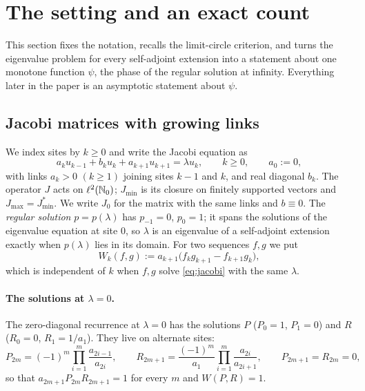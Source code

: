 \section{The setting and an exact count}\label{sec:setting}

This section fixes the notation, recalls the limit-circle criterion, and turns the
eigenvalue problem for every self-adjoint extension into a statement about one
monotone function $\psi$, the phase of the regular solution at infinity. Everything
later in the paper is an asymptotic statement about $\psi$.

\subsection{Jacobi matrices with growing links}

We index sites by $k\ge0$ and write the Jacobi equation as
\begin{equation}\label{eq:jacobi}
  a_k u_{k-1}+b_k u_k+a_{k+1}u_{k+1}=\lambda u_k,\qquad k\ge0,\qquad a_0:=0,
\end{equation}
with links $a_k>0$ $(k\ge1)$ joining sites $k-1$ and $k$, and real diagonal $b_k$. The
operator $J$ acts on $\ell^2(\mathbb{N}_0)$; $J_{\min}$ is its closure on finitely supported
vectors and $J_{\max}=J_{\min}^*$. We write $J_0$ for the matrix with the same links
and $b\equiv0$. The \emph{regular solution} $p=p(\lambda)$ has $p_{-1}=0$, $p_0=1$; it
spans the solutions of the eigenvalue equation at site $0$, so $\lambda$ is an
eigenvalue of a self-adjoint extension exactly when $p(\lambda)$ lies in its domain.
For two sequences $f,g$ we put
\begin{equation}\label{eq:wronskian}
  W_k(f,g):=a_{k+1}\bigl(f_kg_{k+1}-f_{k+1}g_k\bigr),
\end{equation}
which is independent of $k$ when $f,g$ solve \eqref{eq:jacobi} with the same
$\lambda$.

\paragraph{The solutions at $\lambda=0$.} The zero-diagonal recurrence at $\lambda=0$
has the solutions $P$ ($P_0=1$, $P_1=0$) and $R$ ($R_0=0$, $R_1=1/a_1$). They live on
alternate sites:
\begin{equation}\label{eq:PR}
  P_{2m}=(-1)^m\prod_{i=1}^{m}\frac{a_{2i-1}}{a_{2i}},\qquad
  R_{2m+1}=\frac{(-1)^m}{a_1}\prod_{i=1}^{m}\frac{a_{2i}}{a_{2i+1}},\qquad
  P_{2m+1}=R_{2m}=0,
\end{equation}
so that $a_{2m+1}P_{2m}R_{2m+1}=1$ for every $m$ and $W(P,R)=1$.

